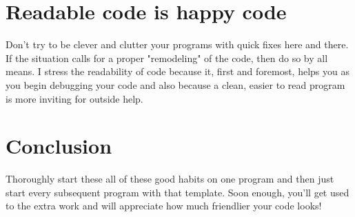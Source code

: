 \documentclass[11pt,oneside]{article}
\newenvironment{articleSection}[1]
{\begin{list}{}
         {\setlength{\leftmargin}{1cm}}
         \item[]
}
{\end{list}}
\newenvironment{articleSectionN}[1]
{#1}
{}
\begin{document}
\section{Readable code is happy code}
\begin{articleSection}{0.5cm}
    Don't try to be clever and clutter your programs with quick fixes here and there. If the situation calls for a proper "remodeling" of the code, then do so by all means. I stress the readability of code because it, first and foremost, helps you as you begin debugging your code and also because a clean, easier to read program is more inviting for outside help.
    \end{articleSection}


\section*{Conclusion}
\begin{articleSectionN}
Thoroughly start these all of these good habits on one program and then just start every subsequent program with that template. Soon enough, you'll get used to the extra work and will appreciate how much friendlier your code looks!
\end{articleSectionN}
\end{document}
